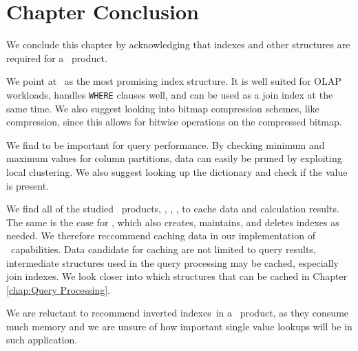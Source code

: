 




\section{Chapter Conclusion}
\label{sec:Chapter Conclusion}
We conclude this chapter by acknowledging that indexes and other structures are required for a \bd~product.

We point at \biti~as the most promising index structure. It is well suited for OLAP workloads, handles \texttt{WHERE} clauses well, and can be used as a join index at the same time. We also suggest looking into bitmap compression schemes, like  compression, since this allows for bitwise operations on the compressed bitmap.

We find  to be important for query performance. By checking minimum and maximum values for column partitions, data can easily be pruned by exploiting local clustering. We also suggest looking up the dictionary and check if the value is present.

We find all of the studied \bd~products, \qlikview, \powerpivot, \tableau, to cache data and calculation results. The same is the case for \exasol, which also creates, maintains, and deletes indexes as needed. We therefore reccommend caching data in our implementation of \bd~capabilities. Data candidate for caching are not limited to query results, intermediate structures used in the query processing may be cached, especially join indexes. We look closer into which structures that can be cached in Chapter \ref{chap:Query Processing}.

We are reluctant to recommend inverted indexes~in a \bd~product, as they consume much memory and we are unsure of how important single value lookups will be in such application.


